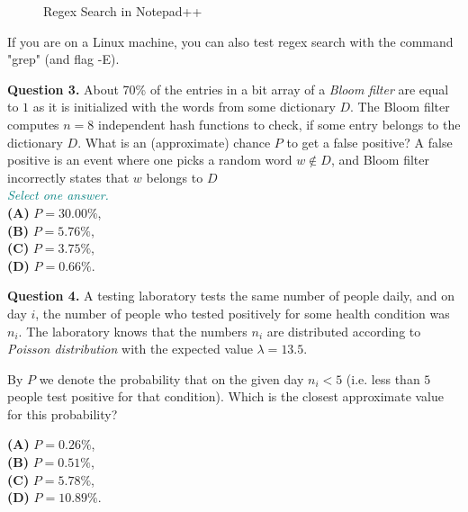 \documentclass[jou]{apa6}
\begin{document}
\begin{figure}[!htb]
\caption{\label{fig:regex-search} Regex Search in Notepad++}
\end{figure}

If you are on a Linux machine, you can also 
test regex search with the command "grep" (and flag -E). 


\vspace{10pt}
{\bf Question 3.} About 70\% of the entries in a bit array of a {\em Bloom filter} are 
equal to $1$ as it is initialized with the words 
from some dictionary $D$. 
The Bloom filter computes $n=8$ independent hash functions to check, 
if some entry belongs to the dictionary $D$. 
What is an (approximate) chance $P$ to get a false positive?
A false positive is an event where one picks 
a random word $w \not\in D$,
and Bloom filter incorrectly states that $w$ belongs to $D$\\

\vspace{4pt}
\textcolor{teal}{\em Select one answer.}\\
{\bf (A)} $P = 30.00\%$,\\
{\bf (B)} $P = 5.76\%$,\\
{\bf (C)} $P = 3.75\%$,\\
{\bf (D)} $P = 0.66\%$.



\vspace{10pt}
{\bf Question 4.} 
A testing laboratory tests the same number of people daily, and on day $i$, the number
of people who tested positively for some health condition was $n_i$. The laboratory knows that 
the numbers $n_i$ are distributed according to {\em Poisson distribution} with the 
expected value $\lambda = 13.5$. 

By $P$ we denote the probability that on the given day 
$n_i < 5$ (i.e. less than $5$ people test 
positive for that condition). Which is the closest approximate value for this probability? 

{\bf (A)} $P = 0.26\%$,\\
{\bf (B)} $P = 0.51\%$,\\
{\bf (C)} $P = 5.78\%$,\\
{\bf (D)} $P = 10.89\%$.
\end{document}
